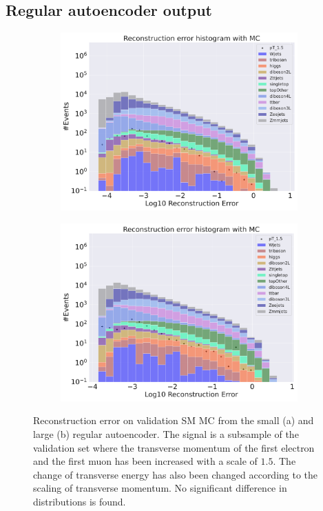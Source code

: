 \subsection*{Regular autoencoder output}
\begin{figure}[H]
    \centering
    \begin{subfigure}{.45\textwidth}
        \includegraphics[width=\textwidth]{Figures/AE_testing/small/b_data_recon_big_rm3_feats_sig_pT_1.5.pdf}
        \caption{ }
        \label{fig:ae_small_pt_1_5}
    \end{subfigure}
    \hfill 
    \begin{subfigure}{.45\textwidth}
        \includegraphics[width=\textwidth]{Figures/AE_testing/big/b_data_recon_big_rm3_feats_sig_pT_1.5.pdf}
        \caption{ }
        \label{fig:ae_big_pt_1_5}
    \end{subfigure}
    \hfill 
    \caption[AE | Reconstruction error $p_T$ altering of 1.5]{Reconstruction error on validation SM MC from the small (a) and large (b) regular autoencoder. The signal is a subsample of the validation 
    set where the transverse momentum of the first electron and the first muon has been increased with a scale of $1.5$. The change of transverse 
    energy has also been changed according to the scaling of transverse momentum. No significant difference in distributions is found. }
    \label{fig:ae_big_small_pt_1_5}
\end{figure}

